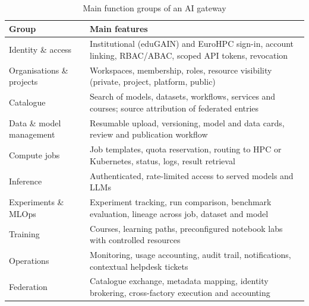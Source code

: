 \documentclass[conference,a4paper]{IEEEtran}
\begin{document}
\begin{table}[t]
\centering
\caption{Main function groups of an AI gateway}
\label{tab:func}
\footnotesize
\renewcommand{\arraystretch}{1.1}
\begin{tabular}{@{}p{2.1cm}p{5.9cm}@{}}
\toprule
\textbf{Group} & \textbf{Main features} \\
\midrule
Identity \& access & Institutional (eduGAIN) and EuroHPC sign-in, account linking, RBAC/ABAC, scoped API tokens, revocation \\
Organisations \& projects & Workspaces, membership, roles, resource visibility (private, project, platform, public) \\
Catalogue & Search of models, datasets, workflows, services and courses; source attribution of federated entries \\
Data \& model management & Resumable upload, versioning, model and data cards, review and publication workflow \\
Compute jobs & Job templates, quota reservation, routing to HPC or Kubernetes, status, logs, result retrieval \\
Inference & Authenticated, rate-limited access to served models and LLMs \\
Experiments \& MLOps & Experiment tracking, run comparison, benchmark evaluation, lineage across job, dataset and model \\
Training & Courses, learning paths, preconfigured notebook labs with controlled resources \\
Operations & Monitoring, usage accounting, audit trail, notifications, contextual helpdesk tickets \\
Federation & Catalogue exchange, metadata mapping, identity brokering, cross-factory execution and accounting \\
\bottomrule
\end{tabular}
\end{table}
\end{document}
